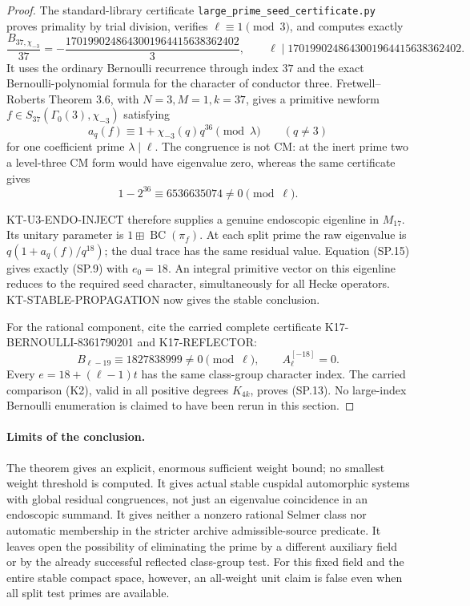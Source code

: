 \begin{proof}
The standard-library certificate
\texttt{large\_prime\_seed\_certificate.py} proves primality
by trial division, verifies $\ell\equiv1\pmod3$, and
computes exactly
\[
 \frac{B_{37,\chi_{-3}}}{37}
       =-\frac{1701990248643001964415638362402}{3},
 \qquad
 \ell\mid1701990248643001964415638362402.
                                                               \tag{SP.14}
\]
It uses the ordinary Bernoulli recurrence through index
$37$ and the exact Bernoulli-polynomial formula for
the character of conductor three. Fretwell--Roberts
Theorem 3.6, with $N=3,M=1,k=37$, gives a primitive
newform $f\in S_{37}(\Gamma_0(3),\chi_{-3})$ satisfying
\[
              a_q(f)\equiv1+\chi_{-3}(q)q^{36}
                            \pmod\lambda
                         \qquad(q\ne3)
                                                               \tag{SP.15}
\]
for one coefficient prime $\lambda\mid\ell$.
The congruence is not CM: at the inert prime two a
level-three CM form would have eigenvalue zero, whereas
the same certificate gives
\[
                    1-2^{36}\equiv6536635074\ne0\pmod\ell.
                                                               \tag{SP.16}
\]

KT-U3-ENDO-INJECT therefore supplies a genuine endoscopic
eigenline in $M_{17}$. Its unitary parameter is
$1\boxplus\operatorname{BC}(\pi_f)$. At each split prime
the raw eigenvalue is $q(1+a_q(f)/q^{18})$; the dual
trace has the same residual value. Equation (SP.15)
gives exactly (SP.9) with $e_0=18$. An integral primitive
vector on this eigenline reduces to the required seed
character, simultaneously for all Hecke operators.
KT-STABLE-PROPAGATION now gives the stable conclusion.

For the rational component, cite the carried complete
certificate K17-BERNOULLI-8361790201 and K17-REFLECTOR:
\[
             B_{\ell-19}\equiv1827838999\ne0\pmod\ell,
             \qquad A_\ell^{[-18]}=0.
\]
Every $e=18+(\ell-1)t$ has the same class-group character
index. The carried comparison (K2), valid in all positive
degrees $K_{4k}$, proves (SP.13). No large-index Bernoulli
enumeration is claimed to have been rerun in this section.
\end{proof}

\paragraph{Limits of the conclusion.}
The theorem gives an explicit, enormous sufficient weight
bound; no smallest weight threshold is computed. It gives actual
stable cuspidal automorphic systems with global residual
congruences, not just an eigenvalue coincidence in an
endoscopic summand. It gives neither a nonzero rational
Selmer class nor automatic membership in the stricter
archive admissible-source predicate. It leaves open the
possibility of eliminating the prime by a different
auxiliary field or by the already successful reflected
class-group test. For this fixed field and the entire
stable compact space, however, an all-weight unit claim
is false even when all split test primes are available.

